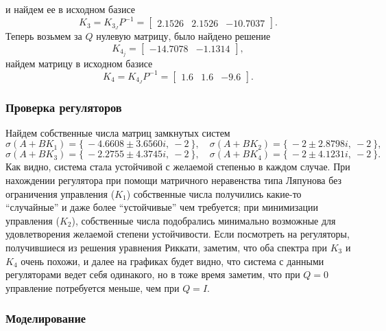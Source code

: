 и найдем ее в исходном базисе
\begin{equation*}
    K_3=K_{3_J}P^{-1}=\begin{bmatrix}
        2.1526&2.1526& -10.7037
    \end{bmatrix}.
\end{equation*}
Теперь возьмем за $Q$ нулевую матрицу, было найдено решение
\begin{equation*}
    K_{4_j}=\begin{bmatrix}
        -14.7078& -1.1314
    \end{bmatrix},
\end{equation*}
найдем матрицу в исходном базисе
\begin{equation*}
    K_4=K_{4_J}P^{-1}=\begin{bmatrix}
        1.6&1.6& -9.6
    \end{bmatrix}.
\end{equation*}



\subsubsection{Проверка регуляторов}

Найдем собственные числа матриц замкнутых систем
\begin{equation*}
    \sigma(A+BK_1)=\{\ -4.6608 \pm 3.6560i,\ -2\ \},\quad
    \sigma(A+BK_2)=\{\ -2 \pm 2.8798i,\ -2\ \},
\end{equation*}
\begin{equation*}
    \sigma(A+BK_3)=\{\ -2.2755 \pm 4.3745i,\ -2\ \},\quad
    \sigma(A+BK_4)=\{\ -2 \pm 4.1231i,\ -2\ \}.
\end{equation*}
Как видно, система стала устойчивой с желаемой степенью в каждом случае. При нахождении 
регулятора при помощи матричного неравенства типа Ляпунова без ограничения управления 
($K_1$) собственные числа получились какие-то ``случайные''
и даже более ``устойчивые'' чем требуется; при минимизации управления ($K_2$), собственные
числа подобрались минимально возможные для удовлетворения желаемой степени устойчивости.
Если посмотреть на регуляторы, получившиеся из решения уравнения Риккати, заметим, что
оба спектра при $K_3$ и $K_4$ очень похожи, и далее на графиках будет видно, что система с данными
регуляторами ведет себя одинакого, но в тоже время заметим, что при $Q=0$ управление
потребуется меньше, чем при $Q=I$.




\subsubsection{Моделирование}

